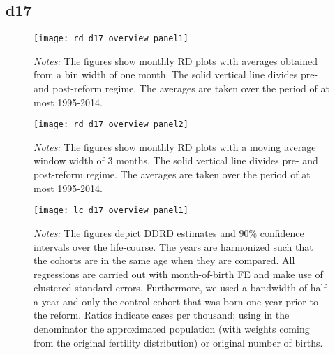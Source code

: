 \subsection{d17}
\begin{landscape}
\begin{figure}[H]
	\centering
	\begin{minipage}{.95\linewidth}
	\texttt{[image: rd\_d17\_overview\_panel1]}
	{\scriptsize \emph{Notes:} The figures show monthly RD plots with averages obtained from a bin width of one month. The solid vertical line divides pre- and post-reform regime. The averages are taken over the period of at most 1995-2014. \par}
\end{minipage}
\end{figure}
\end{landscape}
\begin{landscape}
\begin{figure}[H]
	\centering
\begin{minipage}{.95\linewidth}
	\texttt{[image: rd\_d17\_overview\_panel2]}
	{\scriptsize \emph{Notes:} The figures show monthly RD plots with a moving average window width of 3 months. The solid vertical line divides pre- and post-reform regime. The averages are taken over the period of at most 1995-2014. \par}
\end{minipage}
\end{figure}
\end{landscape}


\begin{landscape}
\begin{figure}[H]
\centering
\begin{minipage}{.9\linewidth}
\texttt{[image: lc\_d17\_overview\_panel1]}
{\scriptsize \emph{Notes:} The figures depict DDRD estimates and 90\% confidence intervals over the life-course. The years are harmonized such that the cohorts are in the same age when they are compared. All regressions are carried out with month-of-birth FE and make use of clustered standard errors. Furthermore, we used a bandwidth of half a year and only the control cohort that was born one year prior to the reform. Ratios indicate cases per thousand; using in the denominator the approximated population (with weights coming from the original fertility distribution) or original number of births. \par}
\end{minipage}
\end{figure}
\end{landscape}
